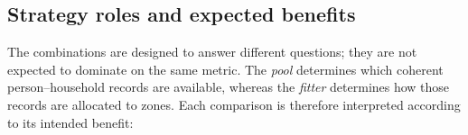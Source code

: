 \documentclass[review]{elsarticle}
\begin{document}


\subsection{Strategy roles and expected benefits}
\label{sec:strategy_roles}
The combinations are designed to answer different questions; they are not expected to dominate on the same metric. The \emph{pool} determines which coherent person--household records are available, whereas the \emph{fitter} determines how those records are allocated to zones. Each comparison is therefore interpreted according to its intended benefit:
\end{document}
